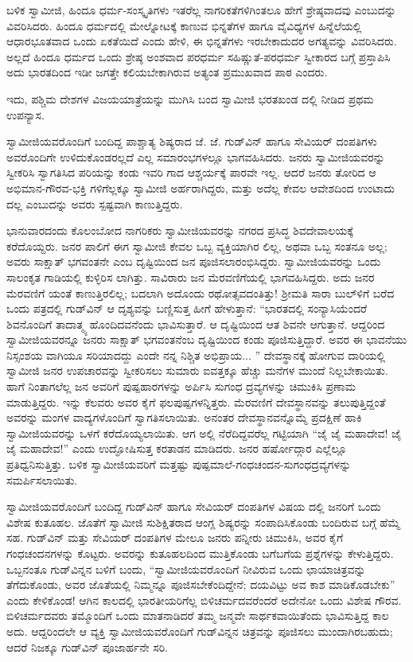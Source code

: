 ಬಳಿಕ ಸ್ವಾಮೀಜಿ, ಹಿಂದೂ ಧರ್ಮ-ಸಂಸ್ಕೃತಿಗಳು ಇತರೆಲ್ಲ ನಾಗರಿಕತೆಗಳಿಗಿಂತಲೂ ಹೇಗೆ ಶ್ರೇಷ್ಠವಾದವು ಎಂಬುದನ್ನು ವಿವರಿಸಿದರು. ಹಿಂದೂ ಧರ್ಮದಲ್ಲಿ ಮೇಲ್ನೋಟಕ್ಕೆ ಕಾಣುವ ಭಿನ್ನತೆಗಳ ಹಾಗೂ ವೈವಿಧ್ಯಗಳ ಹಿನ್ನೆಲೆಯಲ್ಲಿ ಆಧಾರಭೂತವಾದ ಒಂದು ಏಕತೆಯಿದೆ ಎಂದು ಹೇಳಿ, ಈ ಭಿನ್ನತೆಗಳು ಇರಬೇಕಾದುದರ ಅಗತ್ಯವನ್ನು ವಿವರಿಸಿದರು. ಅಲ್ಲದೆ ಹಿಂದೂ ಧರ್ಮದ ಒಂದು ಶ್ರೇಷ್ಠ ಅಂಶವಾದ ಪರಧರ್ಮ ಸಹಿಷ್ಣುತೆ-ಪರಧರ್ಮ ಸ್ವೀಕಾರದ ಬಗ್ಗೆ ಪ್ರಸ್ತಾಪಿಸಿ ಅದು ಭಾರತದಿಂದ ಇಡೀ ಜಗತ್ತೇ ಕಲಿಯಬೇಕಾಗಿರುವ ಅತ್ಯಂತ ಪ್ರಮುಖವಾದ ಪಾಠ ಎಂದರು.

ಇದು, ಪಶ್ಚಿಮ ದೇಶಗಳ ವಿಜಯಯಾತ್ರೆಯನ್ನು ಮುಗಿಸಿ ಬಂದ ಸ್ವಾಮೀಜಿ ಭರತಖಂಡ ದಲ್ಲಿ ನೀಡಿದ ಪ್ರಥಮ ಉಪನ್ಯಾಸ.

ಸ್ವಾಮೀಜಿಯವರೊಂದಿಗೆ ಬಂದಿದ್ದ ಪಾಶ್ಚಾತ್ಯ ಶಿಷ್ಯರಾದ ಜೆ. ಜೆ. ಗುಡ್​ವಿನ್ ಹಾಗೂ ಸೇವಿಯರ್ ದಂಪತಿಗಳು ಅವರೊಂದಿಗೇ ಉಳಿದುಕೊಂಡರಲ್ಲದೆ ಎಲ್ಲ ಸಮಾರಂಭಗಳಲ್ಲೂ ಭಾಗವಹಿಸಿದರು. ಜನರು ಸ್ವಾಮೀಜಿಯವರನ್ನು ಸ್ವೀಕರಿಸಿ ಸ್ವಾಗತಿಸಿದ ಪರಿಯನ್ನು ಕಂಡು ಇವರಿ ಗಾದ ಆಶ್ಚರ್ಯಕ್ಕೆ ಪಾರವೇ ಇಲ್ಲ. ಆದರೆ ಜನರು ತೋರಿದ ಆ ಅಭಿಮಾನ-ಗೌರವ-ಭಕ್ತಿ ಗಳಿಗೆಲ್ಲಕ್ಕೂ ಸ್ವಾಮೀಜಿ ಅರ್ಹರಾಗಿದ್ದರು, ಮತ್ತು ಅದೆಲ್ಲ ಕೇವಲ ಆವೇಶದಿಂದ ಉಂಟಾದು ದಲ್ಲ ಎಂಬುದನ್ನು ಅವರು ಸ್ಪಷ್ಟವಾಗಿ ಕಾಣುತ್ತಿದ್ದರು.

ಭಾನುವಾರದಂದು ಕೊಲಂಬೋದ ನಾಗರಿಕರು ಸ್ವಾಮೀಜಿಯವರನ್ನು ನಗರದ ಪ್ರಸಿದ್ಧ ಶಿವದೇವಾಲಯಕ್ಕೆ ಕರೆದೊಯ್ದರು. ಜನರ ಪಾಲಿಗೆ ಈಗ ಸ್ವಾಮೀಜಿ ಕೇವಲ ಒಬ್ಬ ವ್ಯಕ್ತಿಯಾಗಿರ ಲಿಲ್ಲ, ಅಥವಾ ಒಬ್ಬ ಸಂತನೂ ಅಲ್ಲ; ಅವರು ಸಾಕ್ಷಾತ್ ಭಗವಂತನೇ ಎಂಬ ದೃಷ್ಟಿಯಿಂದ ಜನ ಪೂಜಿಸಲಾರಂಭಿಸಿದ್ದರು. ಸ್ವಾಮೀಜಿಯವರನ್ನು ಒಂದು ಸಾಲಂಕೃತ ಗಾಡಿಯಲ್ಲಿ ಕುಳ್ಳಿರಿಸ ಲಾಗಿತ್ತು. ಸಾವಿರಾರು ಜನ ಮೆರವಣಿಗೆಯಲ್ಲಿ ಭಾಗವಹಿಸಿದ್ದರು. ಅದು ಜನರ ಮೆರವಣಿಗೆ ಯಂತೆ ಕಾಣುತ್ತಿರಲಿಲ್ಲ; ಬದಲಾಗಿ ಅದೊಂದು ರಥೋತ್ಸವದಂತಿತ್ತು! ಶ್ರೀಮತಿ ಸಾರಾ ಬುಲ್​ಳಿಗೆ ಬರೆದ ಒಂದು ಪತ್ರದಲ್ಲಿ ಗುಡ್​ವಿನ್ ಆ ದೃಶ್ಯವನ್ನು ಬಣ್ಣಿಸುತ್ತ ಹೀಗೆ ಹೇಳುತ್ತಾನೆ: “ಭಾರತದಲ್ಲಿ ಸಂನ್ಯಾಸಿಯೆಂದರೆ ಶಿವನೊಂದಿಗೆ ತಾದಾತ್ಮ್ಯ ಹೊಂದಿದವನೆಂದು ಭಾವಿಸುತ್ತಾರೆ. ಆ ದೃಷ್ಟಿಯಿಂದ ಆತ ಶಿವನೇ ಆಗುತ್ತಾನೆ. ಆದ್ದರಿಂದ ಸ್ವಾಮೀಜಿಯವರನ್ನೂ ಜನರು ಸಾಕ್ಷಾತ್ ಭಗವಂತನೆಂಬ ದೃಷ್ಟಿಯಿಂದ ಕಂಡು ಪೂಜಿಸುತ್ತಿದ್ದಾರೆ. ಅವರ ಈ ಭಾವನೆಯು ನಿಸ್ಸಂಶಯ ವಾಗಿಯೂ ಸರಿಯಾದದ್ದು ಎಂದೇ ನನ್ನ ನಿಶ್ಚಿತ ಅಭಿಪ್ರಾಯ... ” ದೇವಸ್ಥಾನಕ್ಕೆ ಹೋಗುವ ದಾರಿಯಲ್ಲಿ ಸ್ವಾಮೀಜಿ ಜನರ ಉಪಚಾರವನ್ನು ಸ್ವೀಕರಿಸಲು ಸುಮಾರು ಐವತ್ತಕ್ಕೂ ಹೆಚ್ಚು ಮನೆಗಳ ಮುಂದೆ ನಿಲ್ಲಬೇಕಾಯಿತು. ಹಾಗೆ ನಿಂತಾಗಲೆಲ್ಲ ಜನ ಅವರಿಗೆ ಪುಷ್ಪಹಾರಗಳನ್ನು ಅರ್ಪಿಸಿ ಸುಗಂಧ ದ್ರವ್ಯಗಳನ್ನು ಚಿಮುಕಿಸಿ ಪ್ರಣಾಮ ಮಾಡುತ್ತಿದ್ದರು. ಇನ್ನು ಕೆಲವರು ಅವರ ಕೈಗೆ ಫಲಪುಷ್ಪಗಳನ್ನಿತ್ತರು. ಮೆರವಣಿಗೆ ದೇವಸ್ಥಾನವನ್ನು ತಲುಪುತ್ತಿದ್ದಂತೆ ಅವರನ್ನು ಮಂಗಳ ವಾದ್ಯಗಳೊಂದಿಗೆ ಸ್ವಾಗತಿಸಲಾಯಿತು. ಅನಂತರ ದೇವಸ್ಥಾನವನ್ನೊಮ್ಮೆ ಪ್ರದಕ್ಷಿಣೆ ಹಾಕಿ ಸ್ವಾಮೀಜಿಯವರನ್ನು ಒಳಗೆ ಕರೆದೊಯ್ಯಲಾಯಿತು. ಆಗ ಅಲ್ಲಿ ನೆರೆದಿದ್ದವರೆಲ್ಲ ಗಟ್ಟಿಯಾಗಿ “ಜೈ ಜೈ ಮಹಾದೇವ! ಜೈ ಜೈ ಮಹಾದೇವ!” ಎಂದು ಉದ್ಘೋಷಿಸುತ್ತ ಕರತಾಡನ ಮಾಡಿದರು. ಜನರ ಹರ್ಷೋದ್ಗಾರ ಎಲ್ಲೆಲ್ಲೂ ಪ್ರತಿಧ್ವನಿಸುತ್ತಿತ್ತು. ಬಳಿಕ ಸ್ವಾಮೀಜಿಯವರಿಗೆ ಮತ್ತಷ್ಟು ಪುಷ್ಪಮಾಲೆ-ಗಂಧಚಂದನ-ಸುಗಂಧದ್ರವ್ಯಗಳನ್ನು ಸಮರ್ಪಿಸಲಾಯಿತು.

ಸ್ವಾಮೀಜಿಯವರೊಂದಿಗೆ ಬಂದಿದ್ದ ಗುಡ್​ವಿನ್ ಹಾಗೂ ಸೇವಿಯರ್ ದಂಪತಿಗಳ ವಿಷಯ ದಲ್ಲಿ ಜನರಿಗೆ ಒಂದು ವಿಶೇಷ ಕುತೂಹಲ. ಜೊತೆಗೆ ಸ್ವಾಮೀಜಿ ಸುಶಿಕ್ಷಿತರಾದ ಆಂಗ್ಲ ಶಿಷ್ಯರನ್ನು ಸಂಪಾದಿಸಿಕೊಂಡು ಬಂದಿರುವ ಬಗ್ಗೆ ಹೆಮ್ಮೆ ಸಹ. ಗುಡ್​ವಿನ್ ಮತ್ತು ಸೇವಿಯರ್ ದಂಪತಿಗಳ ಮೇಲೂ ಜನರು ಪನ್ನೀರು ಚಿಮುಕಿಸಿ, ಅವರ ಕೈಗೆ ಗಂಧಚಂದನಗಳನ್ನು ಕೊಟ್ಟರು. ಅವರನ್ನು ಕುತೂಹಲದಿಂದ ಮುತ್ತಿಕೊಂಡು ಬಗೆಬಗೆಯ ಪ್ರಶ್ನೆಗಳನ್ನು ಕೇಳುತ್ತಿದ್ದರು. ಒಬ್ಬನಂತೂ ಗುಡ್​ವಿನ್ನನ ಬಳಿಗೆ ಬಂದು, “ಸ್ವಾಮೀಜಿಯವರೊಂದಿಗೆ ನೀವಿರುವ ಒಂದು ಛಾಯಾಚಿತ್ರವನ್ನು ತೆಗೆದುಕೊಂಡು, ಅವರ ಜೊತೆಯಲ್ಲಿ ನಿಮ್ಮನ್ನೂ ಪೂಜಿಸಬೇಕೆಂದಿದ್ದೇನೆ; ದಯವಿಟ್ಟು ಅವ ಕಾಶ ಮಾಡಿಕೊಡಬೇಕು” ಎಂದು ಕೇಳಿಕೊಂಡ! ಆಗಿನ ಕಾಲದಲ್ಲಿ ಭಾರತೀಯರಿಗೆಲ್ಲ ಬಿಳಿಚರ್ಮದವರೆಂದರೆ ಅದೇನೋ ಒಂದು ವಿಶೇಷ ಗೌರವ. ಬಿಳಿಚರ್ಮದವರು ತಮ್ಮೊಂದಿಗೆ ಒಂದು ಮಾತನಾಡಿದರೆ ತಮ್ಮ ಜನ್ಮವೇ ಸಾರ್ಥಕವಾಯಿತೆಂದು ಭಾವಿಸುತ್ತಿದ್ದ ಕಾಲ ಅದು. ಆದ್ದರಿಂದಲೇ ಆ ವ್ಯಕ್ತಿ ಸ್ವಾಮೀಜಿಯವರೊಂದಿಗೆ ಗುಡ್​ವಿನ್ನನ ಚಿತ್ರವನ್ನು ಪೂಜಿಸಲು ಮುಂದಾಗಿರಬಹುದು; ಆದರೆ ನಿಜಕ್ಕೂ ಗುಡ್​ವಿನ್ ಪೂಜಾರ್ಹನೇ ಸರಿ.

